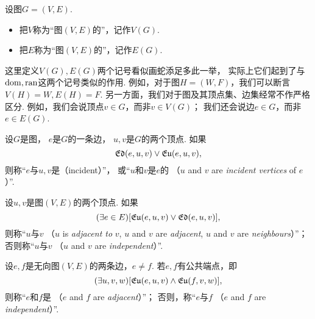 \begin{definition}
设图\(G = (V,E)\).
\begin{itemize}
	\item 把\(V\)称为“图\((V,E)\)的”，记作\(V(G)\).
	\item 把\(E\)称为“图\((V,E)\)的”，记作\(E(G)\).
\end{itemize}
\end{definition}
\begin{remark}
这里定义\(V(G),E(G)\)两个记号看似画蛇添足多此一举，
实际上它们起到了与\(\operatorname{dom},\operatorname{ran}\)这两个记号类似的作用.
例如，对于图\(H = (W,F)\)，我们可以断言\(V(H) = W,E(H) = F\).
另一方面，我们对于图及其顶点集、边集经常不作严格区分.
例如，我们会说顶点\(v \in G\)，而非\(v \in V(G)\)；
我们还会说边\(e \in G\)，而非\(e \in E(G)\).
\end{remark}

\begin{definition}
设\(G\)是图，
\(e\)是\(G\)的一条边，
\(u,v\)是\(G\)的两个顶点.
如果\[
	\mathfrak{Ed}(e,u,v)
	\lor
	\mathfrak{Eu}(e,u,v),
\]
则称“\(e\)与\(u,v\)是（incident）”，
或“\(u\)和\(v\)是\(e\)的%
（\(u\) and \(v\) are \emph{incident vertices} of \(e\)）”.
\end{definition}

\begin{definition}
设\(u,v\)是图\((V,E)\)的两个顶点.
如果\[
	(\exists e \in E)
	[
		\mathfrak{Eu}(e,u,v)
		\lor
		\mathfrak{Ed}(e,u,v)
	],
\]
则称“\(u\)与\(v\) %
（\(u\) is \emph{adjacent to} \(v\),
\(u\) and \(v\) are \emph{adjacent},
\(u\) and \(v\) are \emph{neighbours}）”；
否则称“\(u\)与\(v\) %
（\(u\) and \(v\) are \emph{independent}）”.
\end{definition}

\begin{definition}
设\(e,f\)是无向图\((V,E)\)的两条边，\(e \neq f\).
若\(e,f\)有公共端点，即\[
	(\exists u,v,w)
	[
		\mathfrak{Eu}(e,u,v)
		\land
		\mathfrak{Eu}(f,v,w)
	],
\]
则称“\(e\)和\(f\)是%
（\(e\) and \(f\) are \emph{adjacent}）”；
否则，称“\(e\)与\(f\) %
（\(e\) and \(f\) are \emph{independent}）”.
\end{definition}


